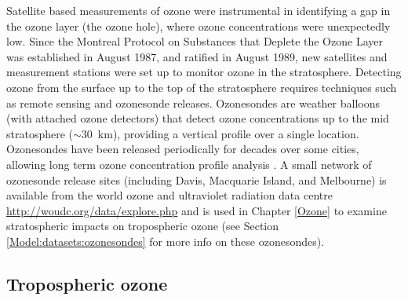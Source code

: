     
    Satellite based measurements of ozone were instrumental in identifying a gap in the ozone layer (the ozone hole), where ozone concentrations were unexpectedly low.
    Since the Montreal Protocol on Substances that Deplete the Ozone Layer was established in August 1987, and ratified in August 1989, new satellites and measurement stations were set up to monitor ozone in the stratosphere.
    Detecting ozone from the surface up to the top of the stratosphere requires techniques such as remote sensing and ozonesonde releases.
    Ozonesondes are weather balloons (with attached ozone detectors) that detect ozone concentrations up to the mid stratosphere ($\sim 30$~km), providing a vertical profile over a single location.
    Ozonesondes have been released periodically for decades over some cities, allowing long term ozone concentration profile analysis \parencite[e.g.,][]{Brinksma2002}.
    A small network of ozonesonde release sites (including Davis, Macquarie Island, and Melbourne) is available from the world ozone and ultraviolet radiation data centre \url{http://woudc.org/data/explore.php} and is used in Chapter \ref{Ozone} to examine stratospheric impacts on tropospheric ozone (see Section \ref{Model:datasets:ozonesondes} for more info on these ozonesondes).
  
  \subsection{Tropospheric ozone}
    
